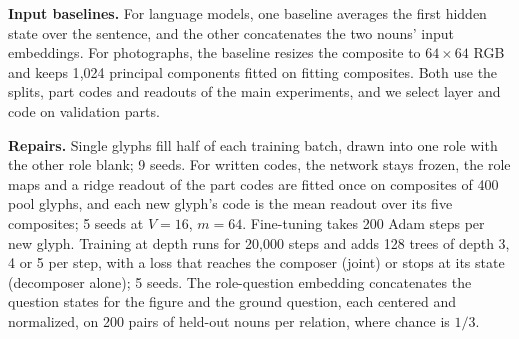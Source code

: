 \documentclass[10pt]{article}
\theoremstyle{plain}
\theoremstyle{remark}
\begin{document}
\textbf{Input baselines.} For language models, one baseline averages the first hidden state over the sentence, and the other concatenates the two nouns' input embeddings. For photographs, the baseline resizes the composite to $64 \times 64$ RGB and keeps 1{,}024 principal components fitted on fitting composites. Both use the splits, part codes and readouts of the main experiments, and we select layer and code on validation parts.

\textbf{Repairs.} Single glyphs fill half of each training batch, drawn into one role with the other role blank; 9 seeds. For written codes, the network stays frozen, the role maps and a ridge readout of the part codes are fitted once on composites of 400 pool glyphs, and each new glyph's code is the mean readout over its five composites; 5 seeds at $V = 16$, $m = 64$. Fine-tuning takes 200 Adam steps per new glyph. Training at depth runs for 20{,}000 steps and adds 128 trees of depth 3, 4 or 5 per step, with a loss that reaches the composer (joint) or stops at its state (decomposer alone); 5 seeds. The role-question embedding concatenates the question states for the figure and the ground question, each centered and normalized, on 200 pairs of held-out nouns per relation, where chance is $1/3$.
\end{document}
